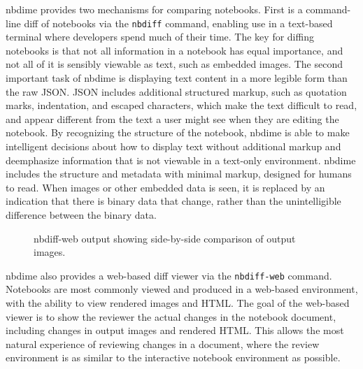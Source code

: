\documentclass{deliverablereport}
\begin{document}
nbdime provides two mechanisms for comparing notebooks. First is a command-line diff of notebooks
via the \texttt{nbdiff} command, enabling use in a text-based terminal where developers spend much
of their time. The key for diffing notebooks is that not all information in a notebook has equal
importance, and not all of it is sensibly viewable as text, such as embedded images. The second
important task of nbdime is displaying text content in a more legible form than the raw JSON. JSON
includes additional structured markup, such as quotation marks, indentation, and escaped
characters, which make the text difficult to read, and appear different from the text a user might
see when they are editing the notebook. By recognizing the structure of the notebook, nbdime is
able to make intelligent decisions about how to display text without additional markup and deemphasize information that is not viewable in a text-only environment.
nbdime includes the structure and metadata with minimal markup, designed for humans to read.
When images or other embedded data is seen, it is replaced by an indication that there is binary data that change, rather than the unintelligible difference between the binary data.

\begin{figure}
    \center
    \caption{nbdiff-web output showing side-by-side comparison of output images.}
    \label{fig:nbdiff-web}
\end{figure}

nbdime also provides a web-based diff viewer via the \texttt{nbdiff-web} command. Notebooks are
most commonly viewed and produced in a web-based environment, with the ability to view rendered
images and HTML. The goal of the web-based viewer is to show the reviewer the actual changes in the
notebook document, including changes in output images and rendered HTML.
This allows the most natural experience of reviewing changes in a document, where the review environment is as similar to the interactive notebook environment as possible.
\end{document}
